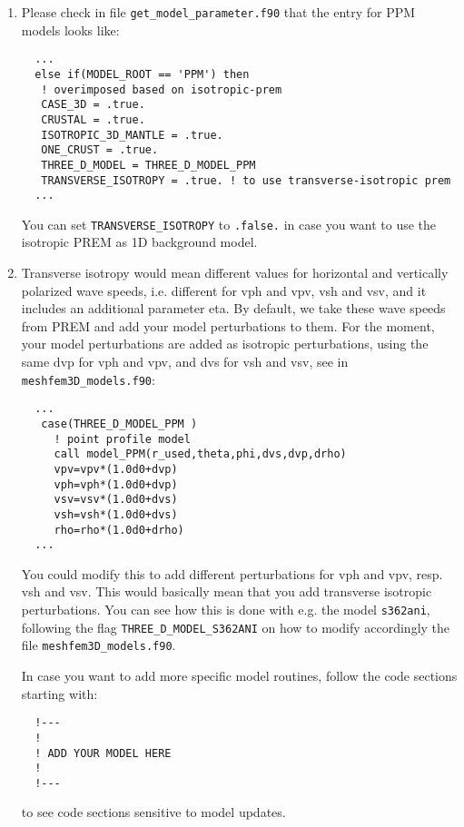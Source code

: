 \begin{description}
\begin{enumerate}
\item Please check in file \texttt{get\_model\_parameter.f90} that the entry for PPM models looks like:

{\footnotesize
\begin{verbatim}
  ...
  else if(MODEL_ROOT == 'PPM') then
   ! overimposed based on isotropic-prem
   CASE_3D = .true.
   CRUSTAL = .true.
   ISOTROPIC_3D_MANTLE = .true.
   ONE_CRUST = .true.
   THREE_D_MODEL = THREE_D_MODEL_PPM
   TRANSVERSE_ISOTROPY = .true. ! to use transverse-isotropic prem
  ...
\end{verbatim}
}

\noindent
You can set \texttt{TRANSVERSE\_ISOTROPY} to \texttt{.false.} in case you want to use the isotropic PREM
as 1D background model.

\item Transverse isotropy would mean different values for horizontal and vertically polarized wave speeds,
i.e. different for vph and   vpv, vsh and vsv, and it includes an additional parameter eta.
By default, we take these wave speeds from PREM and add your model perturbations to them.
For the moment, your model perturbations are added as isotropic perturbations, using the same dvp for vph and vpv,
and dvs for vsh   and vsv, see in \texttt{meshfem3D\_models.f90}:

{\footnotesize
\begin{verbatim}
  ...
   case(THREE_D_MODEL_PPM )
     ! point profile model
     call model_PPM(r_used,theta,phi,dvs,dvp,drho)
     vpv=vpv*(1.0d0+dvp)
     vph=vph*(1.0d0+dvp)
     vsv=vsv*(1.0d0+dvs)
     vsh=vsh*(1.0d0+dvs)
     rho=rho*(1.0d0+drho)
  ...
\end{verbatim}
}

\noindent
You could modify this to add different perturbations for vph and vpv, resp. vsh and vsv.
This would basically mean that you add transverse isotropic perturbations.
You can see how this is done with e.g. the model \texttt{s362ani},
following the flag \texttt{THREE\_D\_MODEL\_S362ANI} on how to modify accordingly the file \texttt{meshfem3D\_models.f90}.

In case you want to add more specific model routines, follow the code sections starting with:

{\footnotesize
\begin{verbatim}
  !---
  !
  ! ADD YOUR MODEL HERE
  !
  !---
\end{verbatim}
}

\noindent
to see code sections sensitive to model updates.

  \end{enumerate}

\end{description}



